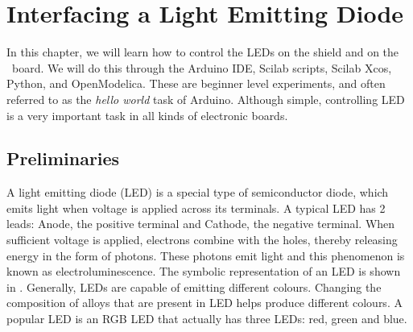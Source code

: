\chapter {Interfacing a Light Emitting Diode}
\thispagestyle{empty}
\label{led}
\newcommand{\LocLEDfig}{\Origin/user-code/led/figures}
\newcommand{\LocLEDscicode}{\Origin/user-code/led/scilab}
\newcommand{\LocLEDscibrief}[1]{{\tt \seqsplit{%
        Origin/user-code/led/scilab/#1}}, see \fnrefp{fn:file-loc}}
\newcommand{\LocLEDardcode}{\Origin/user-code/led/arduino}
\newcommand{\LocLEDardbrief}[1]{{\tt \seqsplit{%
        Origin/user-code/led/arduino/#1}}, see \fnrefp{fn:file-loc}}

\newcommand{\LocLEDpycode}{\Origin/user-code/led/python}  %
\newcommand{\LocLEDpybrief}[1]{{\tt \seqsplit{%
        Origin/user-code/led/python/#1}}, see \fnrefp{fn:file-loc}} %


\newcommand{\LocLEDjuliacode}{\Origin/user-code/led/julia}  %
\newcommand{\LocLEDjuliabrief}[1]{{\tt \seqsplit{%
        Origin/user-code/led/julia/#1}}, see \fnrefp{fn:file-loc}} %

\newcommand{\LocLEDOpenModelicacode}{\Origin/user-code/led/OpenModelica}  %
\newcommand{\LocLEDOpenModelicabrief}[1]{{\tt \seqsplit{%
        Origin/user-code/led/OpenModelica/#1}}, see \fnrefp{fn:file-loc}} %


In this chapter, we will learn how to control the LEDs on the shield
and on the \arduino\ board.  We will do this through the Arduino IDE,
Scilab scripts, Scilab Xcos, Python, and OpenModelica.  These are beginner level experiments,
and often referred to as the \emph{hello world} task of Arduino.
Although simple, controlling LED is a very important task in all
kinds of electronic boards.

\section{Preliminaries}
\label{sec:led-pril}
A light emitting diode (LED) is a special type of semiconductor diode,
which emits light when voltage is applied across its terminals. A
typical LED has 2 leads: Anode, the positive terminal and Cathode, the
negative terminal.  When sufficient voltage is applied, electrons
combine with the holes, thereby releasing energy in the form of
photons.  These photons emit light and this phenomenon is known as
electroluminescence.  The symbolic representation of an LED is shown
in .  Generally, LEDs are capable of emitting
different colours.  Changing the composition of alloys that are
present in LED helps produce different colours.  A popular LED is an
RGB LED that actually has three LEDs: red, green and blue.

